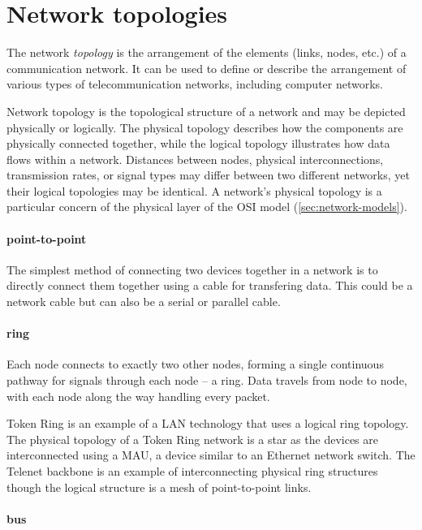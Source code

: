 \section{Network topologies}
\label{sec:network-topologies}

The network \emph{topology} is the arrangement of the elements (links, nodes, etc.) of a communication network.
It can be used to define or describe the arrangement of various types of telecommunication networks, including computer networks.

Network topology is the topological structure of a network and may be depicted physically or logically.
The physical topology describes how the components are physically connected together, while the logical topology illustrates how data flows within a network.
Distances between nodes, physical interconnections, transmission rates, or signal types may differ between two different networks, yet their logical topologies may be identical.
A network’s physical topology is a particular concern of the physical layer of the \gls{OSI} model (\vref{sec:network-models}).



\paragraph{point-to-point}
The simplest method of connecting two devices together in a network is to directly connect them together using a cable for transfering data.
This could be a network cable but can also be a serial or parallel cable.


\paragraph{ring}
Each node connects to exactly two other nodes, forming a single continuous pathway for signals through each node -- a ring.
Data travels from node to node, with each node along the way handling every packet.

Token Ring is an example of a \gls{LAN} technology that uses a logical ring topology.
The physical topology of a Token Ring network is a star as the devices are interconnected using a \ac{MAU}, a device similar to an Ethernet network switch.
The Telenet backbone is an example of interconnecting physical ring structures though the logical structure is a mesh of point-to-point links.


\paragraph{bus}

